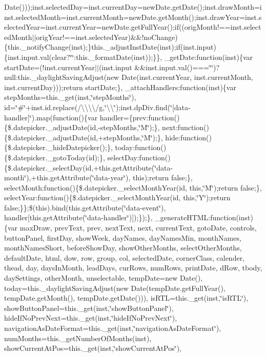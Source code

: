 {{\begin{DoxyParamCaption}
Date()));inst.\+selected\+Day=inst.\+current\+Day=new\+Date.\+get\+Date();inst.\+draw\+Month=inst.\+selected\+Month=inst.\+current\+Month=new\+Date.\+get\+Month();inst.\+draw\+Year=inst.\+selected\+Year=inst.\+current\+Year=new\+Date.\+get\+Full\+Year();if((orig\+Month!==inst.\+selected\+Month$\vert$$\vert$orig\+Year!==inst.\+selected\+Year)\&\&!no\+Change)\{this.\+\_\+notify\+Change(inst);\}this.\+\_\+adjust\+Inst\+Date(inst);if(inst.\+input)\{inst.\+input.\+val(clear?\char`\"{}\char`\"{}\+:this.\+\_\+format\+Date(inst));\}\}, \+\_\+get\+Date\+:function(inst)\{var start\+Date=(!inst.\+current\+Year$\vert$$\vert$(inst.\+input \&\&inst.\+input.\+val()===\char`\"{}\char`\"{})?null\+:this.\+\_\+daylight\+Saving\+Adjust(new Date(inst.\+current\+Year, inst.\+current\+Month, inst.\+current\+Day)));return start\+Date;\}, \+\_\+attach\+Handlers\+:function(inst)\{var step\+Months=this.\+\_\+get(inst,\char`\"{}step\+Months\char`\"{}), id=\char`\"{}\#\char`\"{}+inst.\+id.\+replace(/\textbackslash{}\textbackslash{}\textbackslash{}\textbackslash{}/g,\char`\"{}\textbackslash{}\textbackslash{}\char`\"{});inst.\+dp\+Div.\+find(\char`\"{}\mbox{[}data-\/handler\mbox{]}\char`\"{}).\+map(function()\{var handler=\{prev\+:function()\{\$.\+datepicker.\+\_\+adjust\+Date(id,-\/step\+Months,\char`\"{}\+M\char`\"{});\}, next\+:function()\{\$.\+datepicker.\+\_\+adjust\+Date(id,+step\+Months,\char`\"{}\+M\char`\"{});\}, hide\+:function()\{\$.\+datepicker.\+\_\+hide\+Datepicker();\}, today\+:function()\{\$.\+datepicker.\+\_\+goto\+Today(id);\}, select\+Day\+:function()\{\$.\+datepicker.\+\_\+select\+Day(id,+this.\+get\+Attribute(\char`\"{}data-\/month\char`\"{}),+this.\+get\+Attribute(\char`\"{}data-\/year\char`\"{}), this);return false;\}, select\+Month\+:function()\{\$.\+datepicker.\+\_\+select\+Month\+Year(id, this,\char`\"{}\+M\char`\"{});return false;\}, select\+Year\+:function()\{\$.\+datepicker.\+\_\+select\+Month\+Year(id, this,\char`\"{}\+Y\char`\"{});return false;\}\};\$(this).\+bind(this.\+get\+Attribute(\char`\"{}data-\/event\char`\"{}), handler\mbox{[}this.\+get\+Attribute(\char`\"{}data-\/handler\char`\"{})\mbox{]});\});\}, \+\_\+generate\+H\+T\+M\+L\+:function(inst)\{var max\+Draw, prev\+Text, prev, next\+Text, next, current\+Text, goto\+Date, controls, button\+Panel, first\+Day, show\+Week, day\+Names, day\+Names\+Min, month\+Names, month\+Names\+Short, before\+Show\+Day, show\+Other\+Months, select\+Other\+Months, default\+Date, html, dow, row, group, col, selected\+Date, corner\+Class, calender, thead, day, days\+In\+Month, lead\+Days, cur\+Rows, num\+Rows, print\+Date, d\+Row, tbody, day\+Settings, other\+Month, unselectable, temp\+Date=new Date(), today=this.\+\_\+daylight\+Saving\+Adjust(new Date(temp\+Date.\+get\+Full\+Year(), temp\+Date.\+get\+Month(), temp\+Date.\+get\+Date())), is\+R\+T\+L=this.\+\_\+get(inst,\char`\"{}is\+R\+T\+L\char`\"{}), show\+Button\+Panel=this.\+\_\+get(inst,\char`\"{}show\+Button\+Panel\char`\"{}), hide\+If\+No\+Prev\+Next=this.\+\_\+get(inst,\char`\"{}hide\+If\+No\+Prev\+Next\char`\"{}), navigation\+As\+Date\+Format=this.\+\_\+get(inst,\char`\"{}navigation\+As\+Date\+Format\char`\"{}), num\+Months=this.\+\_\+get\+Number\+Of\+Months(inst), show\+Current\+At\+Pos=this.\+\_\+get(inst,\char`\"{}show\+Current\+At\+Pos\char`\"{}), 
\end{DoxyParamCaption}}}
